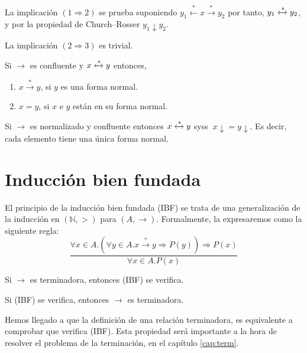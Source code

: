 \begin{demo}
  La implicación $(1 \Rightarrow 2)$ se prueba suponiendo
  $y_1 \xleftarrow{*} x \xrightarrow{*} y_2$ por tanto,
  $y_1 \xleftrightarrow{*} y_2$, y por la propiedad de Church--Rosser
  $y_1 \downarrow y_2$.  

  La implicación $(2 \Rightarrow 3)$ es trivial.
\end{demo}


\begin{coro} 
  Si $\rightarrow$ es confluente y $x \xleftrightarrow{*} y$ entonces,
  \begin{enumerate}
  \item $ x \xrightarrow{*} y$, si $y$ es una forma normal. 
  \item $x=y$, si $x$ e $y$ están en su forma normal.
  \end{enumerate}         
\end{coro}

\begin{teor}
  Si $\rightarrow$ es normalizado y confluente entonces
  $ x \xleftrightarrow{*} y$ syss $\ x \downarrow = y \downarrow$. Es decir,
  cada elemento tiene una única forma normal.
\end{teor}

\section{Inducción bien fundada}

El principio de la inducción bien fundada (IBF) se trata de una generalización
de la inducción en $(\mathbb{N},>)$ para $(A,\rightarrow)$.  Formalmente, la
expresaremos como la siguiente regla:
\begin{equation*}
  \frac{\forall x \in A. (\forall y \in A. x \xrightarrow{+} y \Rightarrow P(y)) \Rightarrow P(x)} 
       {\forall x \in A. P(x)}
\end{equation*}


\begin{teor}  
  Si $\rightarrow$ es terminadora, entonces (IBF) se verifica.
\end{teor}

\begin{teor}  
  Si (IBF) se verifica, entonces $\rightarrow$ es terminadora.
\end{teor}

Hemos llegado a que la definición de una relación terminadora, es equivalente a
comprobar que verifica (IBF). Esta propiedad será importante a la hora de
resolver el problema de la terminación, en el capítulo \ref{cap:term}.

